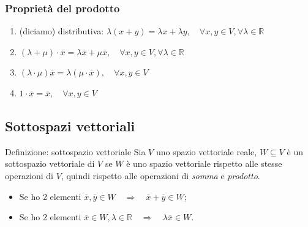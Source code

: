 \documentclass[x11names]{article}
\begin{document}
\subsubsection{Proprietà del prodotto}
\begin{enumerate}
    \item (diciamo) distributiva: $\lambda(x+y) = \lambda x + \lambda y,\quad \forall x,y \in V, \forall \lambda \in \mathbb{R}$
    \item $(\lambda + \mu)\cdot \overline{x} = \lambda \overline{x} + \mu \overline{x}, \quad \forall x,y \in V, \forall \lambda \in \mathbb{R}$
    \item $(\lambda \cdot \mu)\overline{x} = \lambda(\mu \cdot \overline{x}),\quad \forall x,y \in V$
    \item $1 \cdot \overline{x} = \overline{x}, \quad \forall x,y \in V$
\end{enumerate}



\subsection{Sottospazi vettoriali}
\begin{center}
\colorbox{myblue}{\begin{minipage}{5.75in}
\begin{blues}{Definizione: sottospazio vettoriale}
Sia $V$ uno spazio vettoriale reale, $W \subseteq V $ è un sottospazio vettoriale di $V$ se $W$ è uno spazio vettoriale rispetto alle stesse operazioni di $V$, quindi rispetto alle operazioni di \textit{somma} e \textit{prodotto}.

\begin{itemize}
	\item Se ho 2 elementi $\overline{x},\overline{y}\in W \quad \Rightarrow \quad \overline{x} + \overline{y} \in W$;
	\item Se ho 2 elementi $\overline{x} \in W, \lambda \in \mathbb{R} \quad \Rightarrow \quad \lambda\overline{x} \in W$.
\end{itemize}

\end{blues}
\end{minipage}}        
\end{center}
\end{document}
